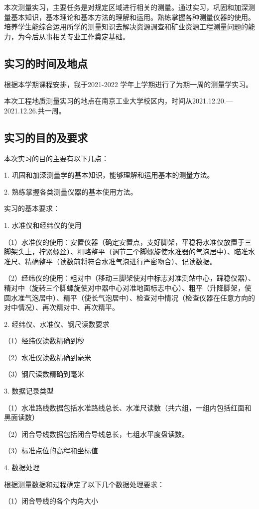 \documentclass[UTF8]{ctexart}
\begin{document}
	本次测量实习，主要任务是对规定区域进行相关的测量。通过实习，巩固和加深测量基本知识，基本理论和基本方法的理解和运用。熟练掌握各种测量仪器的使用。培养学生能综合运用所学的测量知识去解决资源调查和矿业资源工程测量问题的能力，为今后从事相关专业工作奠定基础。
	\subsection{实习的时间及地点}
	根据本学期课程安排，我于2021-2022 学年上学期进行了为期一周的测量学实习。
	
	本次工程地质测量实习的地点在南京工业大学校区内，时间从2021.12.20.—2021.12.26.共一周。
	\subsection{实习的目的及要求}
	本次实习的目的主要有以下几点：
	
	1. 巩固和加深测量学的基本知识，能够理解和运用基本的测量方法。
	
	2. 熟练掌握各类测量仪器的基本使用方法。
	
	实习的基本要求：
	
	1. 水准仪和经纬仪的使用
	
	（1）水准仪的使用：安置仪器（确定安置点，支好脚架，平稳将水准仪放置于三脚架头上，拧紧螺丝）、粗略整平（调节三个脚螺旋使水准器的气泡居中）、瞄准水准尺、精确整平（读数前将符合水准气泡进行严密吻合）、记读数据。
	
	（2）经纬仪的使用：粗对中（移动三脚架使对中标志对准测站中心，踩稳仪器）、精对中（旋转三个脚螺旋使对中器中心对准地面标志中心）、粗平（升降脚架，使圆水准气泡居中）、精平（使长气泡居中）、检查对中情况（检查仪器在任意方向的对中情况）、再次精对中、再次精平。
	
	2. 经纬仪、水准仪、钢尺读数要求
	
	（1）经纬仪读数精确到秒
	
	（2）水准仪读数精确到毫米
	
	（3）钢尺读数精确到毫米
	
	3. 数据记录类型
	
	（1）水准路线数据包括水准路线总长、水准尺读数（共六组，一组内包括红面和黑面读数）
	
	（2）闭合导线数据包括闭合导线总长，七组水平度盘读数。
	
	（3）标准点位的高程和坐标值
	
	4. 数据处理
	
	根据测量数据和过程确定了以下几个数据处理要求：
	
	（1）闭合导线的各个内角大小
	
\end{document}

